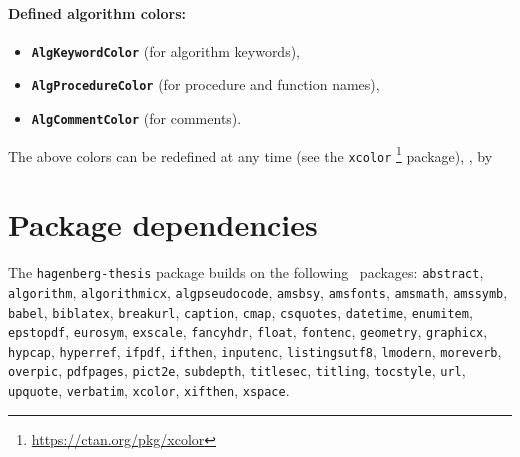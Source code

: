 \documentclass[english]{hgbarticle}
\begin{document}
\paragraph{Defined algorithm colors:}
\begin{itemize}
\item[] \textbf{\texttt{AlgKeywordColor}} (for algorithm keywords),
\item[] \textbf{\texttt{AlgProcedureColor}} (for procedure and function names),
\item[] \textbf{\texttt{AlgCommentColor}} (for comments).
\end{itemize}
The above colors can be redefined at any time (see the \texttt{xcolor}%
\footnote{\url{https://ctan.org/pkg/xcolor}} package), \eg, by
\begin{LaTeXCode}[numbers=none]
\end{LaTeXCode}


\section{Package dependencies}

\begin{sloppypar}
The \texttt{hagenberg-thesis} package builds on the following \latex\ packages:\newline
\texttt{abstract}, 
\texttt{algorithm}, 
\texttt{algorithmicx}, 
\texttt{algpseudocode}, 
\texttt{amsbsy}, 
\texttt{amsfonts}, 
\texttt{amsmath}, 
\texttt{amssymb}, 
\texttt{babel}, 
\texttt{biblatex}, 
\texttt{breakurl}, 
\texttt{caption}, 
\texttt{cmap}, 
\texttt{csquotes}, 
\texttt{datetime}, 
\texttt{enumitem}, 
\texttt{epstopdf}, 
\texttt{eurosym}, 
\texttt{exscale}, 
\texttt{fancyhdr}, 
\texttt{float}, 
\texttt{fontenc}, 
\texttt{geometry}, 
\texttt{graphicx}, 
\texttt{hypcap}, 
\texttt{hyperref}, 
\texttt{ifpdf}, 
\texttt{ifthen}, 
\texttt{inputenc}, 
\texttt{listingsutf8}, 
\texttt{lmodern}, 
\texttt{moreverb}, 
\texttt{overpic}, 
\texttt{pdfpages}, 
\texttt{pict2e}, 
\texttt{subdepth}, 
\texttt{titlesec}, 
\texttt{titling}, 
\texttt{tocstyle},
\texttt{url}, 
\texttt{upquote}, 
\texttt{verbatim}, 
\texttt{xcolor}, 
\texttt{xifthen}, 
\texttt{xspace}.
\end{sloppypar}
\end{document}
